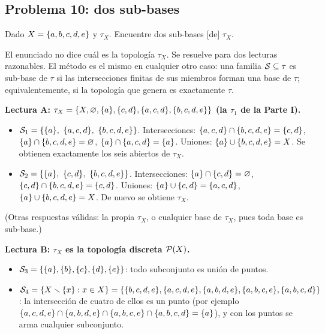 \subsection{Problema 10: dos sub-bases}
\begin{enunciado}
Dado $X=\{a,b,c,d,e\}$ y $\tau_X$. Encuentre dos sub-bases [de] $\tau_X$.
\end{enunciado}
\begin{ojo}[Supuesto S5]
El enunciado no dice cuál es la topología $\tau_X$. Se resuelve para dos lecturas razonables. El método es el mismo
en cualquier otro caso: una familia $\mathcal{S}\subseteq\tau$ es sub-base de $\tau$ si las intersecciones finitas de sus
miembros forman una base de $\tau$; equivalentemente, si la topología que genera es exactamente $\tau$.
\end{ojo}
\textbf{Lectura A: $\tau_X=\{X,\varnothing,\{a\},\{c,d\},\{a,c,d\},\{b,c,d,e\}\}$ (la $\tau_1$ de la Parte I).}
\begin{itemize}
\item $\Sb_1=\{\s{a},\ \s{a,c,d},\ \s{b,c,d,e}\}$. Intersecciones: $\{a,c,d\}\cap\{b,c,d,e\}=\{c,d\}$,
$\{a\}\cap\{b,c,d,e\}=\varnothing$, $\{a\}\cap\{a,c,d\}=\{a\}$. Uniones: $\{a\}\cup\{b,c,d,e\}=X$. Se obtienen exactamente
los seis abiertos de $\tau_X$.
\item $\Sb_2=\{\s{a},\ \s{c,d},\ \s{b,c,d,e}\}$. Intersecciones: $\{a\}\cap\{c,d\}=\varnothing$,
$\{c,d\}\cap\{b,c,d,e\}=\{c,d\}$. Uniones: $\{a\}\cup\{c,d\}=\{a,c,d\}$, $\{a\}\cup\{b,c,d,e\}=X$. De nuevo se
obtiene $\tau_X$.
\end{itemize}
(Otras respuestas válidas: la propia $\tau_X$, o cualquier base de $\tau_X$, pues toda base es sub-base.)

\textbf{Lectura B: $\tau_X$ es la topología discreta $\mathcal{P}(X)$.}
\begin{itemize}
\item $\mathcal{S}_3=\{\{a\},\{b\},\{c\},\{d\},\{e\}\}$: todo subconjunto es unión de puntos.
\item $\mathcal{S}_4=\{X\smallsetminus\{x\}:x\in X\}=\{\{b,c,d,e\},\{a,c,d,e\},\{a,b,d,e\},\{a,b,c,e\},\{a,b,c,d\}\}$: la intersección
de cuatro de ellos es un punto (por ejemplo $\{a,c,d,e\}\cap\{a,b,d,e\}\cap\{a,b,c,e\}\cap\{a,b,c,d\}=\{a\}$), y
con los puntos se arma cualquier subconjunto.
\end{itemize}

